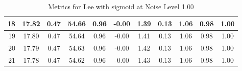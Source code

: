 \begin{table}[htb]
\begin{tabular}{|r|cccccccccc|}
      18 &  17.82 &  0.47 &  54.66 &  0.96 &  -0.00 &  1.39 &  0.13 &  1.06 &  0.98 &  1.00  \\ \hline 
      19 &  17.80 &  0.47 &  54.64 &  0.96 &  -0.00 &  1.41 &  0.13 &  1.06 &  0.98 &  1.00  \\ \hline 
      20 &  17.79 &  0.47 &  54.63 &  0.96 &  -0.00 &  1.42 &  0.13 &  1.06 &  0.98 &  1.00  \\ \hline 
      21 &  17.78 &  0.47 &  54.62 &  0.96 &  -0.00 &  1.43 &  0.13 &  1.06 &  0.98 &  1.00  \\ \hline 
    \end{tabular}
    \caption{Metrics for Lee with sigmoid at Noise Level 1.00}
    \end{table}


